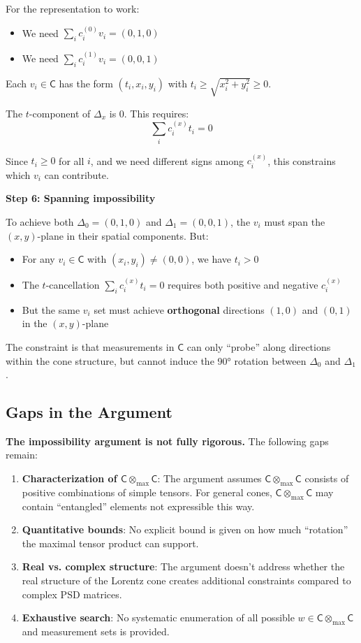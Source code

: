 \documentclass[11pt,a4paper]{article}
\theoremstyle{definition}
\newcommand{\C}{\mathsf{C}}
\newcommand{\tmax}{\otimes_{\max}}
\begin{document}
For the representation to work:
\begin{itemize}
    \item We need $\sum_i c_i^{(0)} v_i = (0, 1, 0)$
    \item We need $\sum_i c_i^{(1)} v_i = (0, 0, 1)$
\end{itemize}

Each $v_i \in \C$ has the form $(t_i, x_i, y_i)$ with $t_i \geq \sqrt{x_i^2 + y_i^2} \geq 0$.

The $t$-component of $\Delta_x$ is 0. This requires:
\[
\sum_i c_i^{(x)} t_i = 0
\]

Since $t_i \geq 0$ for all $i$, and we need different signs among $c_i^{(x)}$, this constrains which $v_i$ can contribute.

\textbf{Step 6: Spanning impossibility}

To achieve both $\Delta_0 = (0,1,0)$ and $\Delta_1 = (0,0,1)$, the $v_i$ must span the $(x,y)$-plane in their spatial components. But:
\begin{itemize}
    \item For any $v_i \in \C$ with $(x_i, y_i) \neq (0,0)$, we have $t_i > 0$
    \item The $t$-cancellation $\sum_i c_i^{(x)} t_i = 0$ requires both positive and negative $c_i^{(x)}$
    \item But the same $v_i$ set must achieve \textbf{orthogonal} directions $(1,0)$ and $(0,1)$ in the $(x,y)$-plane
\end{itemize}

The constraint is that measurements in $\C$ can only ``probe'' along directions within the cone structure, but cannot induce the 90° rotation between $\Delta_0$ and $\Delta_1$.

\subsection{Gaps in the Argument}

\begin{gapbox}
\textbf{The impossibility argument is not fully rigorous.} The following gaps remain:

\begin{enumerate}
    \item \textbf{Characterization of $\C \tmax \C$}: The argument assumes $\C \tmax \C$ consists of positive combinations of simple tensors. For general cones, $\C \tmax \C$ may contain ``entangled'' elements not expressible this way.

    \item \textbf{Quantitative bounds}: No explicit bound is given on how much ``rotation'' the maximal tensor product can support.

    \item \textbf{Real vs. complex structure}: The argument doesn't address whether the real structure of the Lorentz cone creates additional constraints compared to complex PSD matrices.

    \item \textbf{Exhaustive search}: No systematic enumeration of all possible $w \in \C \tmax \C$ and measurement sets is provided.
\end{enumerate}
\end{gapbox}
\end{document}
